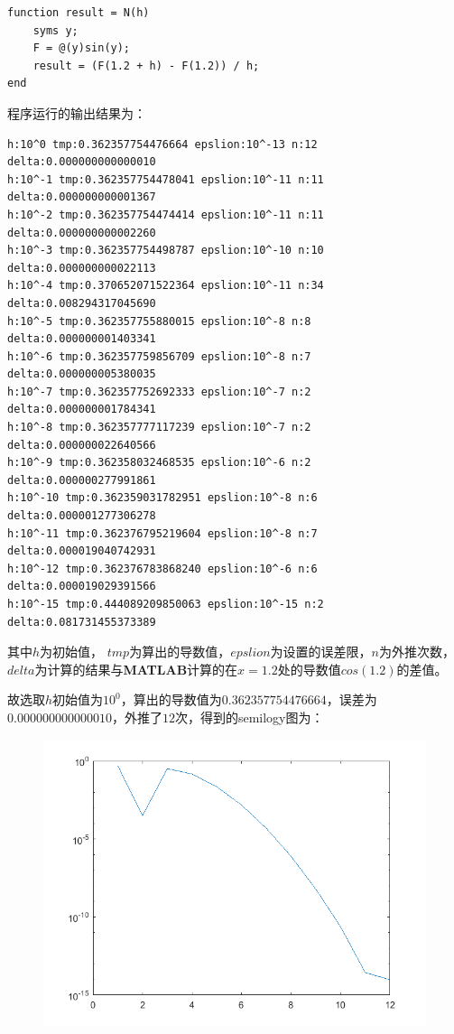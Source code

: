 \documentclass[12pt,a4paper,UTF8]{ctexart}
\theoremstyle{nonumberplain}
\begin{document}
\begin{enumerate}
\begin{enumerate}
\begin{lstlisting}[frame=single]
function result = N(h)
    syms y;
    F = @(y)sin(y);
    result = (F(1.2 + h) - F(1.2)) / h;
end
\end{lstlisting}
                    \par 程序运行的输出结果为：
                    \begin{lstlisting}[frame=single]
h:10^0 tmp:0.362357754476664 epslion:10^-13 n:12 delta:0.000000000000010
h:10^-1 tmp:0.362357754478041 epslion:10^-11 n:11 delta:0.000000000001367
h:10^-2 tmp:0.362357754474414 epslion:10^-11 n:11 delta:0.000000000002260
h:10^-3 tmp:0.362357754498787 epslion:10^-10 n:10 delta:0.000000000022113
h:10^-4 tmp:0.370652071522364 epslion:10^-11 n:34 delta:0.008294317045690
h:10^-5 tmp:0.362357755880015 epslion:10^-8 n:8 delta:0.000000001403341
h:10^-6 tmp:0.362357759856709 epslion:10^-8 n:7 delta:0.000000005380035
h:10^-7 tmp:0.362357752692333 epslion:10^-7 n:2 delta:0.000000001784341
h:10^-8 tmp:0.362357777117239 epslion:10^-7 n:2 delta:0.000000022640566
h:10^-9 tmp:0.362358032468535 epslion:10^-6 n:2 delta:0.000000277991861
h:10^-10 tmp:0.362359031782951 epslion:10^-8 n:6 delta:0.000001277306278
h:10^-11 tmp:0.362376795219604 epslion:10^-8 n:7 delta:0.000019040742931
h:10^-12 tmp:0.362376783868240 epslion:10^-6 n:6 delta:0.000019029391566
h:10^-15 tmp:0.444089209850063 epslion:10^-15 n:2 delta:0.081731455373389  
\end{lstlisting}
                    \par 其中$h$为初始值，
                    $tmp$为算出的导数值，$epslion$为设置的误差限，$n$为外推次数，$delta$为计算的结果与\textbf{MATLAB}计算的在$x=1.2$处的导数值$cos(1.2)$的差值。
                    \par 故选取$h$初始值为$10^0$，算出的导数值为$0.362357754476664$，误差为$0.000000000000010$，外推了$12$次，得到的semilogy图为：
                    \begin{figure}[H]
                        \centering
                        \includegraphics[scale=0.45]{1_3.png}

\end{figure}
\end{enumerate}
\end{enumerate}
\end{document}
